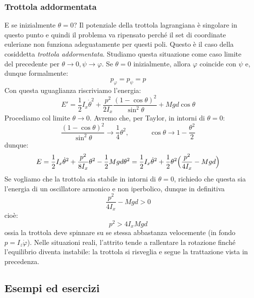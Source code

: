 \documentclass[a4paper,openany]{article}
\begin{document}
	\subsubsection{Trottola addormentata}
	E se inizialmente $\theta = 0$? Il potenziale della trottola lagrangiana è singolare in questo punto e quindi il problema va ripensato perché il set di coordinate euleriane non funziona adeguatamente per questi poli. Questo è il caso della cosiddetta \textit{trottola addormentata}. Studiamo questa situazione come caso limite del precedente per $\theta\to 0, \psi\to\varphi$. Se $\theta=0$ inizialmente, allora $\varphi$ coincide con $\psi$ e, dunque formalmente:
	$$
	p_{\varphi} = p_\psi = p
	$$
	Con questa uguaglianza riscriviamo l'energia:
	$$
	E' = \dfrac{1}{2}I_x\dot{\theta}^2 + \dfrac{p^2}{2I_x}\dfrac{(1-\cos\theta)^2}{\sin^2\theta}+  Mgd\cos\theta
	$$
	Procediamo col limite $\theta\to 0$. Avremo che, per Taylor, in intorni di $\theta=0$:
	$$
	\dfrac{(1-\cos\theta)^2}{\sin^2\theta} \to \dfrac{1}{4}\theta^2, \quad \quad \quad \cos\theta \to 1-\dfrac{\theta^2}{2}
	$$
	dunque:
	$$
	E = \dfrac{1}{2}I_x\dot{\theta}^2 + \dfrac{p^2}{8I_x}\theta^2-\dfrac{1}{2}Mgd\theta^2 =\dfrac{1}{2}I_x\dot{\theta}^2 + \dfrac{1}{2}\theta^2\Bigl(\dfrac{p^2}{4I_x}-Mgd\Bigl)
	$$
	Se vogliamo che la trottola sia stabile in intorni di $\theta=0$, richiedo che questa sia l'energia di un oscillatore armonico e non iperbolico, dunque in definitiva
	\begin{equation}\label{key}
		\dfrac{p^2}{4I_x}-Mgd > 0
	\end{equation}
    cioè:
    \begin{equation}\label{key}
    	p^2 > 4I_xMgd
    \end{equation}
ossia la trottola deve spinnare su se stessa abbastanza velocemente (in fondo $p = I_z\dot\varphi$). Nelle situazioni reali, l'attrito tende a rallentare la rotazione finché l'equilibrio diventa instabile: la trottola si risveglia e segue la trattazione vista in precedenza.
	\newpage 
	\subsection{Esempi ed esercizi}
\end{document}
